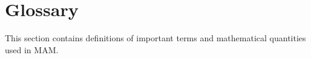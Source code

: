 \section{Glossary}

This section contains definitions of important terms and mathematical quantities
used in MAM.

